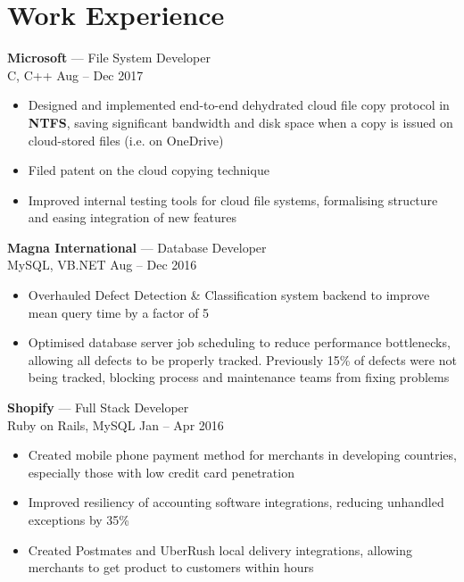 \documentclass[letterpaper,10pt]{article}
\newcommand{\comment}[1]{}
\begin{document}
\begin{minipage}[t]{0.6\textwidth} %

\section{Work Experience}
\medskip

{\large
\textbf{Microsoft} --- File System Developer\\
}
{\footnotesize
C, C++ \hfill Aug -- Dec 2017
}
\begin{itemize}
    \item {Designed and implemented end-to-end dehydrated cloud file copy protocol in \textbf{NTFS}, saving significant bandwidth and disk space when a copy is issued on cloud-stored files (i.e. on OneDrive)}
    \item {Filed patent on the cloud copying technique}   %
    \item {Improved internal testing tools for cloud file systems, formalising structure and easing integration of new features}
\end{itemize}
\bigskip

{\large
\textbf{Magna International} --- Database Developer\\
}
{\footnotesize
MySQL, VB.NET \hfill Aug -- Dec 2016
}
\begin{itemize}
    \item {Overhauled Defect Detection \& Classification system backend to improve mean query time by a factor of 5}
    \item {Optimised database server job scheduling to reduce performance bottlenecks, allowing all defects to be properly tracked. Previously 15\% of defects were not being tracked, blocking process and maintenance teams from fixing problems}
\comment{    \item {Implemented automatic reconnection for dropped mould HMI connections, saving 10 man-hours per week}}
\end{itemize}
\bigskip

{\large
\textbf{Shopify} --- Full Stack Developer\\
}
{\footnotesize
Ruby on Rails, MySQL \hfill Jan -- Apr 2016
}
\begin{itemize}
    \item {Created mobile phone payment method for merchants in developing countries, especially those with low credit card penetration}
    \item {Improved resiliency of accounting software integrations, reducing unhandled exceptions by 35\%}
    \item {Created Postmates and UberRush local delivery integrations, allowing merchants to get product to customers within hours}
\end{itemize}
\bigskip


\end{minipage}
\end{document}
